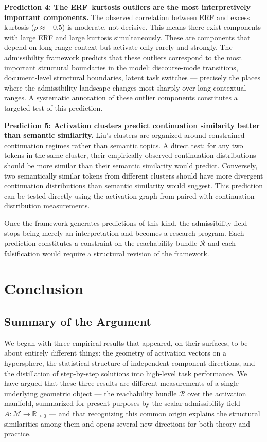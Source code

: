 \documentclass[12pt, a4paper]{article}
\theoremstyle{plain}
\theoremstyle{definition}
\theoremstyle{remark}
\newcommand{\R}{\mathbb{R}}
\newcommand{\cM}{\mathcal{M}}
\newcommand{\fA}{A}
\begin{document}
\textbf{Prediction 4: The ERF--kurtosis outliers are the most interpretively
important components.} The observed correlation between ERF and excess kurtosis
($\rho \approx -0.5$) is moderate, not decisive. This means there exist
components with large ERF and large kurtosis simultaneously. These are
components that depend on long-range context but activate only rarely and
strongly. The admissibility framework predicts that these outliers correspond
to the most important structural boundaries in the model: discourse-mode
transitions, document-level structural boundaries, latent task switches ---
precisely the places where the admissibility landscape changes most sharply
over long contextual ranges. A systematic annotation of these outlier
components constitutes a targeted test of this prediction.

\textbf{Prediction 5: Activation clusters predict continuation similarity
better than semantic similarity.} Liu's clusters are organized around
constrained continuation regimes rather than semantic topics. A direct test:
for any two tokens in the same cluster, their empirically observed continuation
distributions should be more similar than their semantic similarity would
predict. Conversely, two semantically similar tokens from different clusters
should have more divergent continuation distributions than semantic similarity
would suggest. This prediction can be tested directly using the activation
graph from \cite{liu2026normgeometry} paired with continuation-distribution
measurements.

Once the framework generates predictions of this kind, the admissibility field
stops being merely an interpretation and becomes a research program. Each
prediction constitutes a constraint on the reachability bundle $\mathcal{R}$
and each falsification would require a structural revision of the framework.

\section{Conclusion}

\subsection{Summary of the Argument}

We began with three empirical results that appeared, on their surfaces, to be
about entirely different things: the geometry of activation vectors on a
hypersphere, the statistical structure of independent component directions, and
the distillation of step-by-step solutions into high-level task performance.
We have argued that these three results are different measurements of a single
underlying geometric object --- the reachability bundle $\mathcal{R}$ over the
activation manifold, summarized for present purposes by the scalar admissibility
field $\fA : \cM \to \R_{\geq 0}$ --- and that recognizing this common origin
explains the structural similarities among them and opens several new directions
for both theory and practice.
\end{document}
